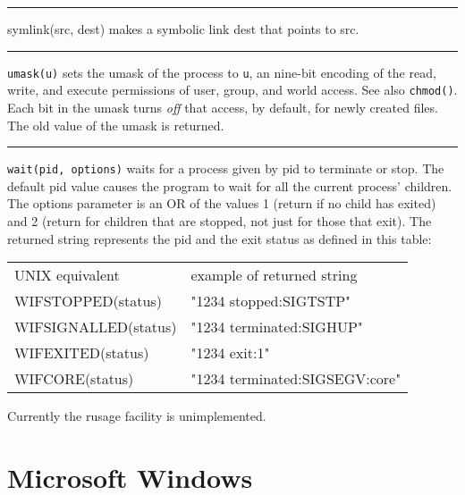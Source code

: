 \bigskip\hrule\vspace{0.1cm}

\noindent
{}symlink(src, dest) makes a symbolic link dest
that points to src.

\bigskip\hrule\vspace{0.1cm}

\noindent
\texttt{umask(u)} sets the umask of the process to \texttt{u}, an nine-bit
encoding of the read, write, and execute permissions of user,
group, and world access. See also \texttt{chmod()}. Each bit in the umask turns
\textit{off} that access, by default, for newly created files. The old
value of the umask is returned.

\bigskip\hrule\vspace{0.1cm}

\noindent
\texttt{wait(pid, options)} waits for a process given by pid to terminate or
stop. The default pid value causes the program to wait for all the
current process' children. The options parameter is an
OR of the values 1 (return if no child has exited) and 2 (return for
children that are stopped, not just for those that exit). The returned
string represents the pid and the exit status as defined in this table:

\vspace{0.05in}
\begin{center}
\begin{supertabular}{m{2.4in} m{2.6in}}
 UNIX equivalent & example of returned string \\
 WIFSTOPPED(status) & "1234 stopped:SIGTSTP" \\
 WIFSIGNALLED(status) & "1234 terminated:SIGHUP" \\
 WIFEXITED(status) & "1234 exit:1" \\
 WIFCORE(status) & "1234 terminated:SIGSEGV:core" \\
\end{supertabular}
\end{center}
\vspace{0.05in}

\noindent
Currently the \textsf{rusage} facility is unimplemented.


\section{Microsoft Windows}

